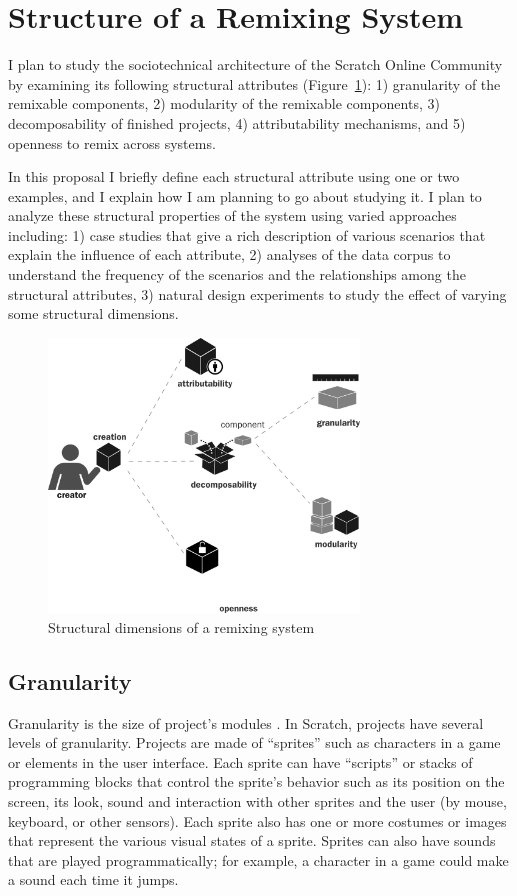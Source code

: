\section{Structure of a Remixing System} 
I plan to study the sociotechnical architecture of the Scratch Online Community by examining its following structural attributes (Figure~\ref{fig:structure}):
1) granularity of the remixable components, 
2) modularity of the remixable components, 
3) decomposability of finished projects, 
4) attributability mechanisms, and 
5) openness to remix across systems.

In this proposal I briefly define each structural attribute using one or two examples, and I explain how I am planning to go about studying it.
I plan to analyze these structural properties of the system using varied approaches including:
1) case studies that give a rich description of various scenarios that explain the influence of each attribute,
2) analyses of the data corpus to understand the frequency of the scenarios and the relationships among the structural attributes,
3) natural design experiments to study the effect of varying some structural dimensions.

\begin{figure} 
\centering
\includegraphics[width=3.25in]{figures/structure.pdf}
\caption{Structural dimensions of a remixing system}
\label{fig:structure}
\end{figure}

\subsection{Granularity}
Granularity is the size of project's modules \citep{benkler_coases_2002}. 
In Scratch, projects have several levels of granularity.
Projects are made of ``sprites'' such as characters in a game or elements in the user interface.
Each sprite can have ``scripts'' or stacks of programming blocks that control the sprite's behavior such as its position on the screen, its look, sound and interaction with other sprites and the user (by mouse, keyboard, or other sensors).
Each sprite also has one or more costumes or images that represent the various visual states of a sprite.
Sprites can also have sounds that are played programmatically; for example, a character in a game could make a sound each time it jumps.

